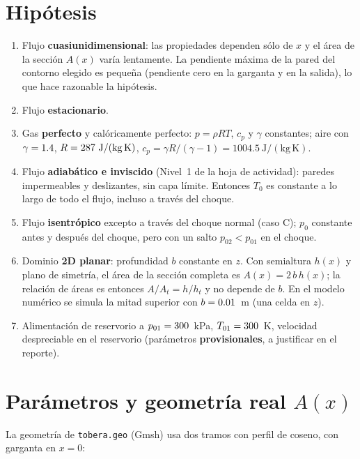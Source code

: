 \documentclass[11pt,a4paper]{article}
\begin{document}
\section{Hipótesis}
\begin{enumerate}[label=\textbf{H\arabic*.},leftmargin=2.2em]
\item Flujo \textbf{cuasiunidimensional}: las propiedades dependen sólo de $x$ y el área de la sección
  $A(x)$ varía lentamente. La pendiente máxima de la pared del contorno elegido es pequeña
  (pendiente cero en la garganta y en la salida), lo que hace razonable la hipótesis.
\item Flujo \textbf{estacionario}.
\item Gas \textbf{perfecto} y calóricamente perfecto: $p=\rho R T$, $c_p$ y $\gamma$ constantes;
  aire con $\gamma=1.4$, $R=287\ \mathrm{J/(kg\,K)}$, $c_p=\gamma R/(\gamma-1)=1004.5\ \mathrm{J/(kg\,K)}$.
\item Flujo \textbf{adiabático e inviscido} (Nivel~1 de la hoja de actividad): paredes impermeables y
  deslizantes, sin capa límite. Entonces $T_0$ es constante a lo largo de todo el flujo, incluso a través del choque.
\item Flujo \textbf{isentrópico} excepto a través del choque normal (caso C); $p_0$ constante antes y
  después del choque, pero con un salto $p_{02}<p_{01}$ en el choque.
\item Dominio \textbf{2D planar}: profundidad $b$ constante en $z$. Con semialtura $h(x)$ y plano de simetría, el área
  de la sección completa es $A(x)=2\,b\,h(x)$; la relación de áreas es entonces
  $A/A_t=h/h_t$ y no depende de $b$. En el modelo numérico se simula la mitad superior con
  $b=0.01$~m (una celda en $z$).
\item Alimentación de reservorio a $p_{01}=300$~kPa, $T_{01}=300$~K, velocidad despreciable en
  el reservorio (parámetros \textbf{provisionales}, a justificar en el reporte).
\end{enumerate}

\section{Parámetros y geometría real $A(x)$}
La geometría de \texttt{tobera.geo} (Gmsh) usa dos tramos con perfil de coseno, con garganta en $x=0$:
\end{document}
